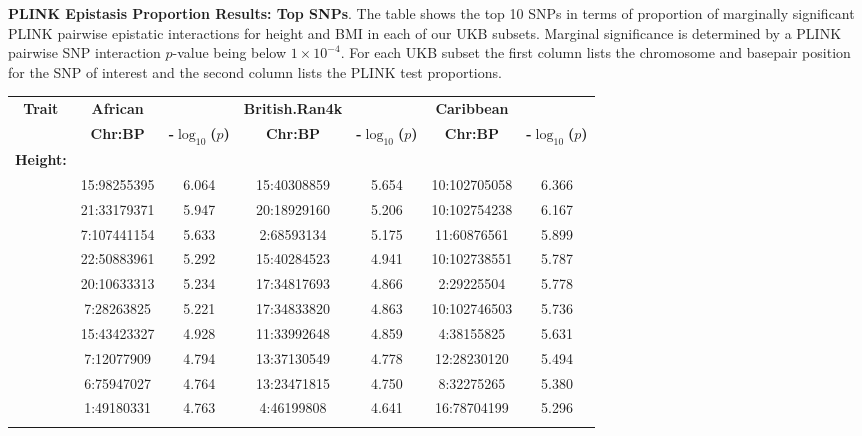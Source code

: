 \documentclass[12pt, a4paper]{article}
\begin{document}
\clearpage
\setlength{\footskip}{1cm}
\addtocounter{table}{-1}

\begin{table} [t!]
  \caption{\textbf{PLINK Epistasis Proportion Results: Top SNPs}. The table shows the top 10 SNPs in terms of proportion of marginally significant PLINK pairwise epistatic interactions for height and BMI in each of our UKB subsets. Marginal significance is determined by a PLINK pairwise SNP interaction $p$-value being below $1\times10^{-4}$. For each UKB subset the first column lists the chromosome and basepair position for the SNP of interest and the second column lists the PLINK test proportions.}
\label{InterPath-Supp-Table-PLINK-Proportions-TopSNPs-Caption}
\end{table}
\clearpage

\begin{landscape}
\setlength{\footskip}{2cm}
\begin{table}[ht]
\centering
\begin{tabular}{ccccccc}
  \hline
  \textbf{Trait} & \textbf{African} & & \textbf{British.Ran4k} & & \textbf{Caribbean} & \\ 
& \textbf{Chr:BP} & \textbf{-$\log_{10}$($p$)} & \textbf{Chr:BP} & \textbf{-$\log_{10}$($p$)} & \textbf{Chr:BP} & \textbf{-$\log_{10}$($p$)} \\ 
  \hline
\textbf{Height:} & & & & & & \\
& 15:98255395 & 6.064 & 15:40308859 & 5.654 & 10:102705058 & 6.366 \\ 
  & 21:33179371 & 5.947 & 20:18929160 & 5.206 & 10:102754238 & 6.167 \\ 
  & 7:107441154 & 5.633 & 2:68593134 & 5.175 & 11:60876561 & 5.899 \\ 
  & 22:50883961 & 5.292 & 15:40284523 & 4.941 & 10:102738551 & 5.787 \\ 
  & 20:10633313 & 5.234 & 17:34817693 & 4.866 & 2:29225504 & 5.778 \\ 
  & 7:28263825 & 5.221 & 17:34833820 & 4.863 & 10:102746503 & 5.736 \\ 
  & 15:43423327 & 4.928 & 11:33992648 & 4.859 & 4:38155825 & 5.631 \\ 
  & 7:12077909 & 4.794 & 13:37130549 & 4.778 & 12:28230120 & 5.494 \\ 
  & 6:75947027 & 4.764 & 13:23471815 & 4.750 & 8:32275265 & 5.380 \\ 
  & 1:49180331 & 4.763 & 4:46199808 & 4.641 & 16:78704199 & 5.296 \\ 
   \\

\end{tabular}
\end{table}
\end{landscape}
\end{document}
